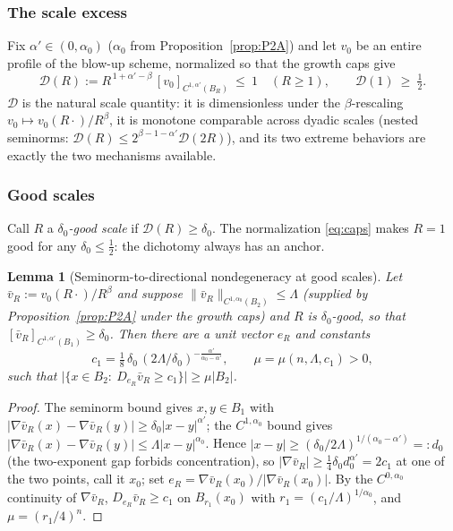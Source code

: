 \documentclass[11pt]{amsart}
\theoremstyle{plain}
\newtheorem{lemma}[theorem]{Lemma}
\theoremstyle{definition}
\theoremstyle{remark}
\newcommand{\al}{\alpha}
\begin{document}
\subsubsection*{The scale excess}
Fix $\al'\in(0,\al_0)$ \textnormal{(}$\al_0$ from
Proposition~\ref{prop:P2A}\textnormal{)} and let $v_0$ be an entire profile
of the blow-up scheme, normalized so that the growth caps give
\begin{equation}\label{eq:caps}
  \mathcal D(R):=R^{\,1+\al'-\beta}\,[v_0]_{C^{1,\al'}(B_R)}\ \le\ 1
  \quad(R\ge1),
  \qquad
  \mathcal D(1)\ \ge\ \tfrac12 .
\end{equation}
$\mathcal D$ is the natural scale quantity: it is dimensionless under the
$\beta$-rescaling $v_0\mapsto v_0(R\cdot)/R^{\beta}$, it is monotone
comparable across dyadic scales \textnormal{(}nested seminorms:
$\mathcal D(R)\le 2^{\beta-1-\al'}\mathcal D(2R)$\textnormal{)}, and its two
extreme behaviors are exactly the two mechanisms available.

\subsubsection*{Good scales}
Call $R$ a \emph{$\delta_0$-good scale} if $\mathcal D(R)\ge\delta_0$. The
normalization \eqref{eq:caps} makes $R=1$ good for any
$\delta_0\le\frac12$: the dichotomy always has an anchor.

\begin{lemma}[Seminorm-to-directional nondegeneracy at good scales]
\label{lem:interp-paper}
Let $\bar v_R:=v_0(R\cdot)/R^{\beta}$ and suppose
$\|\bar v_R\|_{C^{1,\al_0}(B_2)}\le\Lambda$
\textnormal{(}supplied by Proposition~\ref{prop:P2A} under the growth
caps\textnormal{)} and $R$ is $\delta_0$-good, so that
$[\bar v_R]_{C^{1,\al'}(B_1)}\ge\delta_0$. Then there are a unit vector
$e_R$ and constants
\[
  c_1=\tfrac18\,\delta_0\,(2\Lambda/\delta_0)^{-\frac{\al'}{\al_0-\al'}},
  \qquad \mu=\mu(n,\Lambda,c_1)>0,
\]
such that $\big|\{x\in B_2:\ D_{e_R}\bar v_R\ge c_1\}\big|\ge\mu|B_2|$.
\end{lemma}
\begin{proof}
The seminorm bound gives $x,y\in B_1$ with
$|\nabla\bar v_R(x)-\nabla\bar v_R(y)|\ge\delta_0|x-y|^{\al'}$; the
$C^{1,\al_0}$ bound gives
$|\nabla\bar v_R(x)-\nabla\bar v_R(y)|\le\Lambda|x-y|^{\al_0}$. Hence
$|x-y|\ge(\delta_0/2\Lambda)^{1/(\al_0-\al')}=:d_0$
\textnormal{(}the two-exponent gap forbids concentration\textnormal{)}, so
$|\nabla\bar v_R|\ge\frac14\delta_0d_0^{\al'}=2c_1$ at one of the two
points, call it $x_0$; set $e_R=\nabla\bar v_R(x_0)/|\nabla\bar v_R(x_0)|$.
By the $C^{0,\al_0}$ continuity of $\nabla\bar v_R$,
$D_{e_R}\bar v_R\ge c_1$ on $B_{r_1}(x_0)$ with
$r_1=(c_1/\Lambda)^{1/\al_0}$, and $\mu=(r_1/4)^n$.
\end{proof}
\end{document}
